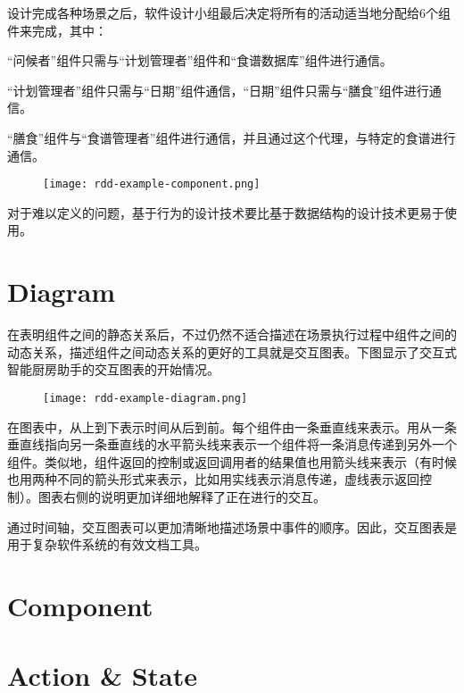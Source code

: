 设计完成各种场景之后，软件设计小组最后决定将所有的活动适当地分配给6个组件来完成，其中：

\begin{compactitem}
\item “问候者”组件只需与“计划管理者”组件和“食谱数据库”组件进行通信。
\item “计划管理者”组件只需与“日期”组件通信，“日期”组件只需与“膳食”组件进行通信。
\item “膳食”组件与“食谱管理者”组件进行通信，并且通过这个代理，与特定的食谱进行通信。
\end{compactitem}

\begin{figure}[htbp]
\centering
\texttt{[image: rdd-example-component.png]}
\end{figure}

对于难以定义的问题，基于行为的设计技术要比基于数据结构的设计技术更易于使用。

\section{Diagram}

在表明组件之间的静态关系后，不过仍然不适合描述在场景执行过程中组件之间的动态关系，描述组件之间动态关系的更好的工具就是交互图表。下图显示了交互式智能厨房助手的交互图表的开始情况。



\begin{figure}[htbp]
\centering
\texttt{[image: rdd-example-diagram.png]}
\end{figure}


在图表中，从上到下表示时间从后到前。每个组件由一条垂直线来表示。用从一条垂直线指向另一条垂直线的水平箭头线来表示一个组件将一条消息传递到另外一个组件。类似地，组件返回的控制或返回调用者的结果值也用箭头线来表示（有时候也用两种不同的箭头形式来表示，比如用实线表示消息传递，虚线表示返回控制）。图表右侧的说明更加详细地解释了正在进行的交互。

通过时间轴，交互图表可以更加清晰地描述场景中事件的顺序。因此，交互图表是用于复杂软件系统的有效文档工具。


\section{Component}


\section{Action \& State}



